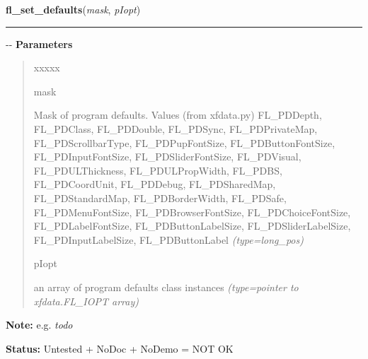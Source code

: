 \hspace{.8\funcindent}\begin{boxedminipage}{\funcwidth}

    \raggedright \textbf{fl\_set\_defaults}(\textit{mask}, \textit{pIopt})

    \vspace{-1.5ex}

    \rule{\textwidth}{0.5\fboxrule}
\setlength{\parskip}{2ex}

-{}-
\setlength{\parskip}{1ex}
      \textbf{Parameters}
      \vspace{-1ex}

      \begin{quote}
        \begin{Ventry}{xxxxx}

          \item[mask]


Mask of program defaults. Values (from xfdata.py) FL\_PDDepth,
FL\_PDClass, FL\_PDDouble, FL\_PDSync, FL\_PDPrivateMap,
FL\_PDScrollbarType, FL\_PDPupFontSize, FL\_PDButtonFontSize,
FL\_PDInputFontSize, FL\_PDSliderFontSize, FL\_PDVisual,
FL\_PDULThickness, FL\_PDULPropWidth, FL\_PDBS, FL\_PDCoordUnit,
FL\_PDDebug, FL\_PDSharedMap, FL\_PDStandardMap, FL\_PDBorderWidth,
FL\_PDSafe, FL\_PDMenuFontSize, FL\_PDBrowserFontSize,
FL\_PDChoiceFontSize, FL\_PDLabelFontSize, FL\_PDButtonLabelSize,
FL\_PDSliderLabelSize, FL\_PDInputLabelSize, FL\_PDButtonLabel
            {\it (type=long\_pos)}

          \item[pIopt]


an array of program defaults class instances
            {\it (type=pointer to xfdata.FL\_IOPT array)}

        \end{Ventry}

      \end{quote}

\textbf{Note:} 
e.g. \emph{todo}


\textbf{Status:} 
Untested + NoDoc + NoDemo = NOT OK


    \end{boxedminipage}

    \label{xformslib:flxbasic:fl_set_tabstop}

    \vspace{0.5ex}

